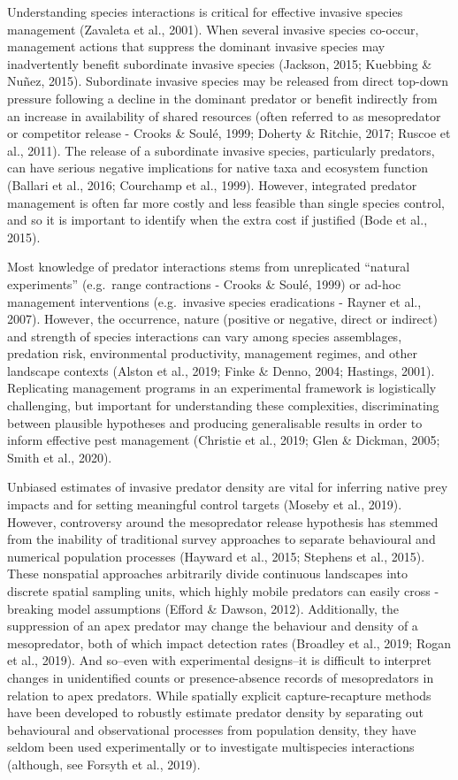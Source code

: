 \documentclass[]{elsarticle} %
\begin{document}
Understanding species interactions is critical for effective invasive species management (Zavaleta et al., 2001).
When several invasive species co-occur, management actions that suppress the dominant invasive species may inadvertently benefit subordinate invasive species (Jackson, 2015; Kuebbing \& Nuñez, 2015).
Subordinate invasive species may be released from direct top-down pressure following a decline in the dominant predator or benefit indirectly from an increase in availability of shared resources (often referred to as mesopredator or competitor release - Crooks \& Soulé, 1999; Doherty \& Ritchie, 2017; Ruscoe et al., 2011).
The release of a subordinate invasive species, particularly predators, can have serious negative implications for native taxa and ecosystem function (Ballari et al., 2016; Courchamp et al., 1999).
However, integrated predator management is often far more costly and less feasible than single species control, and so it is important to identify when the extra cost if justified (Bode et al., 2015).

Most knowledge of predator interactions stems from unreplicated ``natural experiments'' (e.g.~range contractions - Crooks \& Soulé, 1999) or ad-hoc management interventions (e.g.~invasive species eradications - Rayner et al., 2007).
However, the occurrence, nature (positive or negative, direct or indirect) and strength of species interactions can vary among species assemblages, predation risk, environmental productivity, management regimes, and other landscape contexts (Alston et al., 2019; Finke \& Denno, 2004; Hastings, 2001).
Replicating management programs in an experimental framework is logistically challenging, but important for understanding these complexities, discriminating between plausible hypotheses and producing generalisable results in order to inform effective pest management (Christie et al., 2019; Glen \& Dickman, 2005; Smith et al., 2020).

Unbiased estimates of invasive predator density are vital for inferring native prey impacts and for setting meaningful control targets (Moseby et al., 2019). However, controversy around the mesopredator release hypothesis has stemmed from the inability of traditional survey approaches to separate behavioural and numerical population processes (Hayward et al., 2015; Stephens et al., 2015).
These nonspatial approaches arbitrarily divide continuous landscapes into discrete spatial sampling units, which highly mobile predators can easily cross - breaking model assumptions (Efford \& Dawson, 2012).
Additionally, the suppression of an apex predator may change the behaviour and density of a mesopredator, both of which impact detection rates (Broadley et al., 2019; Rogan et al., 2019).
And so--even with experimental designs--it is difficult to interpret changes in unidentified counts or presence-absence records of mesopredators in relation to apex predators.
While spatially explicit capture-recapture methods have been developed to robustly estimate predator density by separating out behavioural and observational processes from population density, they have seldom been used experimentally or to investigate multispecies interactions (although, see Forsyth et al., 2019).
\end{document}
